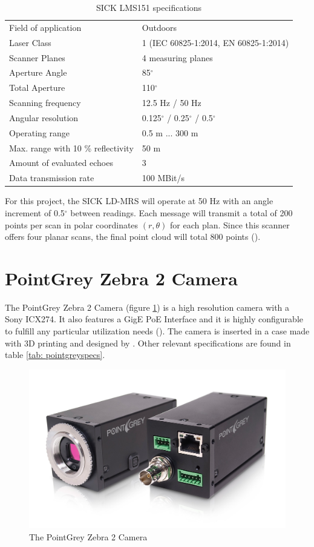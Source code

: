 \begin{table}[!h]
	\centering
	\caption{SICK LMS151 specifications}
	\label{tab: sickldmrsspecs}
	\begin{tabular}{ll}
		\hline
		Field of application & Outdoors\\
		Laser Class & 	1 (IEC 60825-1:2014, EN 60825-1:2014) \\
		Scanner Planes & 4 measuring planes \\
		Aperture Angle & 85$^{\circ}$  \\
		Total Aperture & 110$^{\circ}$\\
		Scanning frequency & 12.5 Hz / 50 Hz \\
		Angular resolution	& 0.125$^{\circ}$ / 0.25$^{\circ}$ / 0.5$^{\circ}$ \\
		Operating range	& 0.5 m ... 300 m \\
		Max. range with 10 \% reflectivity & 50 m \\
		Amount of evaluated echoes & 3 \\
		Data transmission rate & 100 MBit/s \\
		\hline
	\end{tabular}
\end{table}

For this project, the SICK LD-MRS will operate at 50 Hz with an angle increment of 0.5$^{\circ}$ between readings. Each message will transmit a total of 200 points per scan in polar coordinates $(r,\theta)$ for each plan. Since this scanner offers four planar scans, the final point cloud will total 800 points (\cite{SICKa}).

\section{PointGrey Zebra 2 Camera}

The PointGrey Zebra 2 Camera (figure \ref{fig:pointgrey}) is a high resolution camera with a Sony ICX274. It also features a GigE PoE Interface and it is highly configurable to fulfill any particular utilization needs (\cite{PointGrey}). The camera is inserted in a case made with 3D printing and designed by \cite{Correia2017}.  Other relevant specifications are found in table \ref{tab: pointgreyspecs}. 

\begin{figure}[htp]
	
	\centering
	\includegraphics[width=.6\textwidth]{capexp/imgs/pointgrey}
	
	\caption{The PointGrey Zebra 2 Camera}
	\label{fig:pointgrey}
	
\end{figure}

